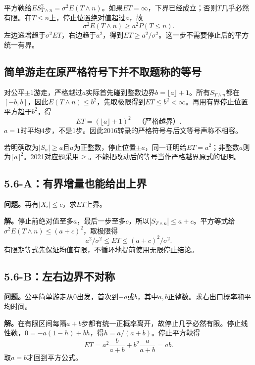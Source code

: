 \documentclass[11pt,a4paper,UTF8,fontset=fandol]{ctexart}
\begin{document}
平方鞅给\(ES_{T\wedge n}^2=\sigma^2E(T\wedge n)\)。如果\(ET=\infty\)，下界已经成立；否则\(T\)几乎必然有限。在\(T\le n\)上，停止位置绝对值超过\(a\)，故
\[\sigma^2E(T\wedge n)\ge a^2P(T\le n).\]
左边递增趋于\(\sigma^2ET\)，右边趋于\(a^2\)，得到\(\boxed{ET\ge a^2/\sigma^2}\)。这一步不需要停止后的平方统一有界。

\subsection{简单游走在原严格符号下并不取题称的等号}\label{ux7b80ux5355ux6e38ux8d70ux5728ux539fux4e25ux683cux7b26ux53f7ux4e0bux5e76ux4e0dux53d6ux9898ux79f0ux7684ux7b49ux53f7}

对公平\(\pm1\)游走，严格越过\(a\)实际首先碰到整数边界\(b=\lfloor a\rfloor+1\)。所有\(S_{T\wedge n}\)都在\([-b,b]\)，因此\(E(T\wedge n)\le b^2\)，先取极限得到\(ET\le b^2<\infty\)。再用有界停止位置平方趋于\(b^2\)，得
\[\boxed{ET=(\lfloor a\rfloor+1)^2\quad\text{（严格越界）}.}\]
\(a=1\)时平均4步，不是1步。因此2016转录的严格符号与后文等号声称不相容。

若明确改为\(|S_n|\ge a\)且\(a\)为正整数，停止位置\(\pm a\)，同一证明给\(ET=a^2\)；非整数\(a\)则为\(\lceil a\rceil^2\)。2021对应题采用\(\ge\)。不能把改动后的等号当作严格越界原式的证明。

\subsection{5.6-A：有界增量也能给出上界}\label{aux6709ux754cux589eux91cfux4e5fux80fdux7ed9ux51faux4e0aux754c}

\textbf{问题。}再有\(|X_i|\le c\)，求\(ET\)上界。

\textbf{解。}停止前绝对值至多\(a\)，最后一步至多\(c\)，所以\(|S_{T\wedge n}|\le a+c\)。平方等式给\(\sigma^2E(T\wedge n)\le(a+c)^2\)，取极限得
\[\boxed{a^2/\sigma^2\le ET\le(a+c)^2/\sigma^2.}\]
有限期等式先保证均值有限，不循环地提前使用无限停止结论。

\subsection{5.6-B：左右边界不对称}\label{bux5de6ux53f3ux8fb9ux754cux4e0dux5bf9ux79f0}

\textbf{问题。}公平简单游走从0出发，首次到\(-a\)或\(b\)，其中\(a,b\)正整数。求右出口概率和平均时间。

\textbf{解。}在有限区间每隔\(a+b\)步都有统一正概率离开，故停止几乎必然有限。停止线性鞅，\(0=-a(1-h)+bh\)，得\(h=a/(a+b)\)。停止平方鞅得
\[ET=a^2\frac b{a+b}+b^2\frac a{a+b}=\boxed{ab}.\]
取\(a=b\)才回到平方公式。
\end{document}
